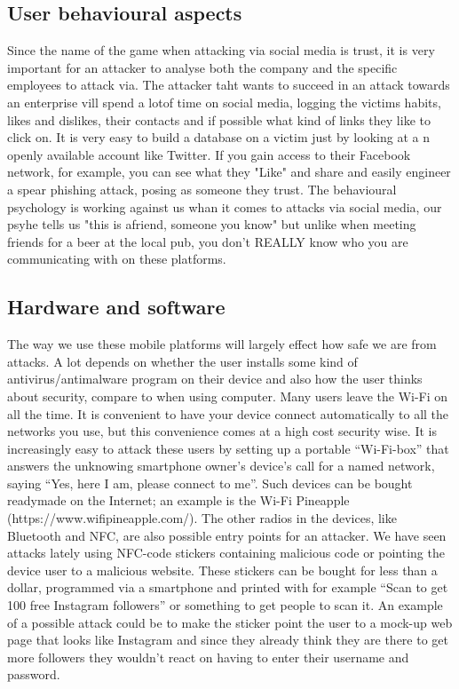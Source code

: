 \subsection{User behavioural aspects}
Since the name of the game when attacking via social media is trust, it is very important for an attacker to analyse both the company and the specific employees to attack via. The attacker taht wants to succeed in an attack towards an enterprise vill spend a lotof time on social media, logging the victims habits, likes and dislikes, their contacts and if possible what kind of links they like to click on. It is very easy to build a database on a victim just by looking at a n openly available account like Twitter. If you gain access to their Facebook network, for example, you can see what they "Like" and share and easily engineer a spear phishing attack, posing as someone they trust. The behavioural psychology is working against us whan it comes to attacks via social media, our psyhe tells us "this is afriend, someone you know" but unlike when meeting friends for a beer at the local pub, you don't REALLY know who you are communicating with on these platforms.
\subsection{Hardware and software}
The way we use these mobile platforms will largely effect how safe we are from attacks. A lot depends on whether the user installs some kind of antivirus/antimalware program on their device and also how the user thinks about security, compare to when using computer.
Many users leave the Wi-Fi on all the time. It is convenient to have your device connect automatically to all the networks you use, but this convenience comes at a high cost security wise. It is increasingly easy to attack these users by setting up a portable “Wi-Fi-box” that answers the unknowing smartphone owner’s device’s call for a named network, saying “Yes, here I am, please connect to me”. Such devices can be bought readymade on the Internet; an example is the Wi-Fi Pineapple (https://www.wifipineapple.com/).
The other radios in the devices, like Bluetooth and NFC, are also possible entry points for an attacker. We have seen attacks lately using NFC-code stickers containing malicious code or pointing the device user to a malicious website. These stickers can be bought for less than a dollar, programmed via a smartphone and printed with for example “Scan to get 100 free Instagram followers” or something to get people to scan it. An example of a possible attack could be to make the sticker point the user to a mock-up web page that looks like Instagram and since they already think they are there to get more followers they wouldn’t react on having to enter their username and password. 
